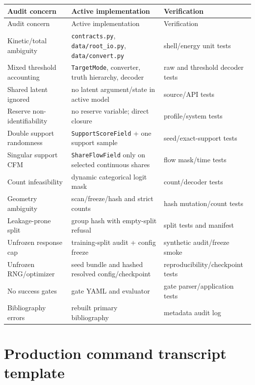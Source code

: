 \documentclass[10pt,a4paper]{article}
\begin{document}
\begin{longtable}{@{}p{}p{}p{}@{}}
\toprule
Audit concern & Active implementation & Verification \\
\midrule
\endfirsthead
\toprule
Audit concern & Active implementation & Verification \\
\midrule
\endhead
Kinetic/total ambiguity & \texttt{contracts.py}, \texttt{data/root\_io.py}, \texttt{data/convert.py} & shell/energy unit tests \\
Mixed threshold accounting & \texttt{TargetMode}, converter, truth hierarchy, decoder & raw and threshold decoder tests \\
Shared latent ignored & no latent argument/state in active model & source/API tests \\
Reserve non-identifiability & no reserve variable; direct closure & profile/system tests \\
Double support randomness & \texttt{SupportScoreField} + one support sample & seed/exact-support tests \\
Singular support CFM & \texttt{ShareFlowField} only on selected continuous shares & flow mask/time tests \\
Count infeasibility & dynamic categorical logit mask & count/decoder tests \\
Geometry ambiguity & scan/freeze/hash and strict counts & hash mutation/count tests \\
Leakage-prone split & group hash with empty-split refusal & split tests and manifest \\
Unfrozen response cap & training-split audit + config freeze & synthetic audit/freeze smoke \\
Unfrozen RNG/optimizer & seed bundle and hashed resolved config/checkpoint & reproducibility/checkpoint tests \\
No success gates & gate YAML and evaluator & gate parser/application tests \\
Bibliography errors & rebuilt primary bibliography & metadata audit log \\
\bottomrule
\end{longtable}

\section{Production command transcript template}
\end{document}

